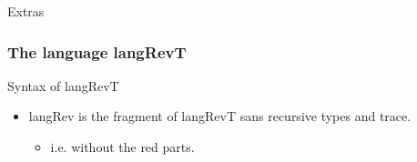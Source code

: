 \documentclass[svgnames,11pt]{beamer}
\begin{document}
\begin{frame}

\vfill
  \begin{center}
    Extras
  \end{center}
\vfill

\end{frame}



\begin{frame}
\frametitle{ The language {{langRevT}} }


\begin{block}{Syntax of {{langRevT}} }
%

%
\end{block}

\begin{itemize}
\item {{langRev}} is the fragment of {{langRevT}} sans recursive types and trace. 
  \begin{itemize}
  \item i.e. without the red parts. 
  \end{itemize}
\end{itemize}







\end{frame}
\end{document}

